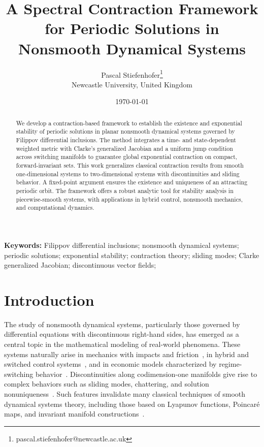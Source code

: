 \documentclass[11pt]{article}
\title{A Spectral Contraction Framework for Periodic Solutions in Nonsmooth Dynamical Systems}
\author{ Pascal Stiefenhofer\footnote{pascal.stiefenhofer@newcastle.ac.uk}\\ 
	Newcastle University, United Kingdom
}
\date{\today}
\begin{document}
	
	\maketitle
	
\begin{abstract}
We develop a contraction-based framework to establish the existence and exponential stability of periodic solutions in planar nonsmooth dynamical systems governed by Filippov differential inclusions. The method integrates a time- and state-dependent weighted metric with Clarke's generalized Jacobian and a uniform jump condition across switching manifolds to guarantee global exponential contraction on compact, forward-invariant sets. This work generalizes classical contraction results from smooth one-dimensional systems to two-dimensional systems with discontinuities and sliding behavior. A fixed-point argument ensures the existence and uniqueness of an attracting periodic orbit. The framework offers a robust analytic tool for stability analysis in piecewise-smooth systems, with applications in hybrid control, nonsmooth mechanics, and computational dynamics.
\end{abstract}


\textbf{Keywords:} Filippov differential inclusions; nonsmooth dynamical systems; periodic solutions; exponential stability; contraction theory; sliding modes; Clarke generalized Jacobian; discontinuous vector fields;

	










\section{Introduction}


The study of nonsmooth dynamical systems, particularly those governed by differential equations with discontinuous right-hand sides, has emerged as a central topic in the mathematical modeling of real-world phenomena. These systems naturally arise in mechanics with impacts and friction~\cite{dibernardo2008,kunze2000}, in hybrid and switched control systems~\cite{pavlov2004}, and in economic models characterized by regime-switching behavior~\cite{ito1979,stiefenhofer2019a,stiefenhofer2019b,stiefenhofer2019c,stiefenhofer2019d,stiefenhofer2020a,stiefenhofer2020b,stiefenhofer2020c}. Discontinuities along codimension-one manifolds give rise to complex behaviors such as sliding modes, chattering, and solution nonuniqueness~\cite{dibernardo2008}. Such features invalidate many classical techniques of smooth dynamical systems theory, including those based on Lyapunov functions, Poincar\'e maps, and invariant manifold constructions~\cite{filippov1988,kunze2001}.
\end{document}
